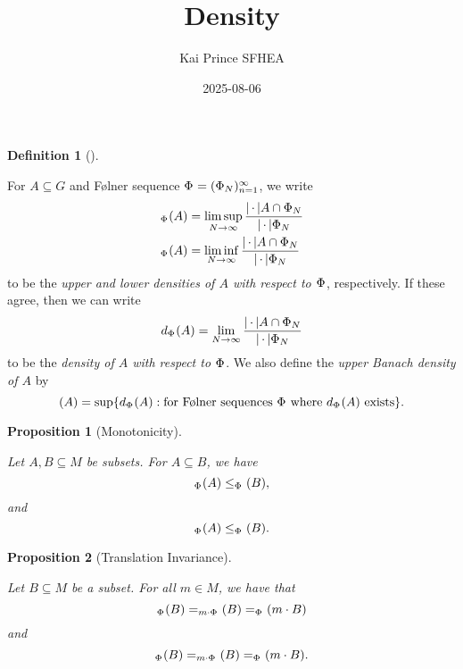 \documentclass[
  british,
]{article}
\title{Density}
\author{Kai Prince SFHEA}
\date{2025-08-06}
\renewcommand*\contentsname{Table of contents}
\newcommand\contentsname{Table of contents}
\theoremstyle{plain}
\newtheorem{proposition}{Proposition}[section]
\theoremstyle{plain}
\theoremstyle{definition}
\newtheorem{definition}{Definition}[section]
\theoremstyle{remark}
\newcommand{\Monoid}{{M}}
\newcommand{\UpperBanachDensity}[1]{({#1})}
\newcommand{\MonoidOperation}[2]{{#1}\cdot{#2}}
\newcommand{\Folner}[1][\vphantom{}]{{\Phi}_{#1}}
\newcommand{\LowerDensity}[2][\Folner]{_{{#1}}({#2})}
\newcommand{\MonoidElement}{{m}}
\newcommand{\Density}[2][\Folner]{d_{{#1}}({#2})}
\newcommand{\UpperDensity}[2][\Folner]{_{{#1}}({#2})}
\newcommand{\Group}{{G}}
\newcommand{\CountingMeasure}[1][\,\cdot\,]{{\left|#1\right|}}
\begin{document}
\maketitle

\renewcommand*\contentsname{Table of contents}
{
\hypersetup{linkcolor=}
\setcounter{tocdepth}{3}
\tableofcontents
}

\begin{definition}[]\protect\hypertarget{def-density}{}\label{def-density}

For \(A\subseteq\Group\) and Følner sequence
\(\Folner=(\Folner[N])_{n=1}^\infty\), we write \begin{align*}
    \UpperDensity{A}&=\limsup_{N\rightarrow\infty}\frac{\CountingMeasure{A\cap\Folner[N]}}{\CountingMeasure{\Folner[N]}}
    \\\LowerDensity{A}&=\liminf_{N\rightarrow\infty}\frac{\CountingMeasure{A\cap\Folner[N]}}{\CountingMeasure{\Folner[N]}}
\end{align*} to be the \emph{upper and lower densities of \(A\) with
respect to \(\Folner\)}, respectively. If these agree, then we can write
\[
\Density{A}=\lim_{N\rightarrow\infty}\frac{\CountingMeasure{A\cap\Folner[N]}}{\CountingMeasure{\Folner[N]}}
\] to be the \emph{density of \(A\) with respect to \(\Folner\)}. We
also define the \emph{upper Banach density of \(A\)} by \[
\UpperBanachDensity{A}=\sup\{d_{\Folner}(A):\text{for Følner sequences }\Folner\text{ where }d_{\Folner}(A)\text{ exists}\}.
\]

\end{definition}

\begin{proposition}[Monotonicity]\protect\hypertarget{prp-DensityMonotonicity}{}\label{prp-DensityMonotonicity}

Let \(A,B\subseteq\Monoid\) be subsets. For \(A\subseteq B\), we
have\[\UpperDensity{A}\leq\UpperDensity{B}, \]and\[\LowerDensity{A}\leq\LowerDensity{B}. \]

\end{proposition}

\begin{proposition}[Translation
Invariance]\protect\hypertarget{prp-DensityTranslationInvariance}{}\label{prp-DensityTranslationInvariance}

Let \(B\subseteq\Monoid\) be a subset. For all
\(\MonoidElement\in\Monoid\), we have that
\[\UpperDensity{B}=\UpperDensity[\MonoidOperation{\MonoidElement}{\Folner}]{B}=\UpperDensity{\MonoidOperation{\MonoidElement}{B}}\]
and
\[\LowerDensity{B}=\LowerDensity[\MonoidOperation{\MonoidElement}{\Folner}]{B}=\LowerDensity{\MonoidOperation{\MonoidElement}{B}}.\]

\end{proposition}
\end{document}

